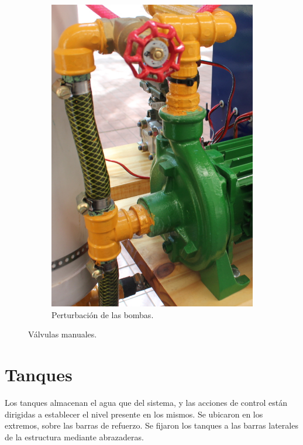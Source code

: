 \begin{figure}[ht]
\begin{subfigure}[b]{0.36\textwidth}
\includegraphics[width=\textwidth]
	{Cap2-DisenoEnsamblado/images/valvBomba.JPG}
                \caption{Perturbación de las bombas.}
                \label{fig:valvBomba}
        \end{subfigure}
        \caption{Válvulas manuales.}
        \label{fig:valvManuales}
\end{figure} 
 
\section{Tanques}
\label{sec:Tanques}

Los tanques almacenan el agua que del sistema, y las acciones de
control están dirigidas a establecer el nivel presente en los mismos.
Se ubicaron en los extremos, sobre las barras de refuerzo.
Se fijaron los tanques a las barras laterales de la estructura mediante
abrazaderas.

